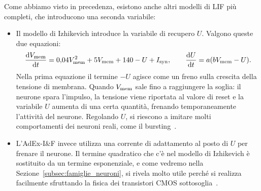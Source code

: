 Come abbiamo visto in precedenza, esistono anche altri modelli di LIF più completi, che introducono una seconda variabile:
\begin{itemize}
  \item Il modello di Izhikevich introduce la variabile di recupero $U$. Valgono queste due equazioni:
  \begin{equation}
    \frac{\mathrm{d}V_{\mathrm{mem}}}{\mathrm{d}t} = 0{,}04V_{\mathrm{mem}}^2 + 5V_{\mathrm{mem}} + 140 - U + I_{\mathrm{syn}},
    \qquad
    \frac{\mathrm{d}U}{\mathrm{d}t} = a(bV_{\mathrm{mem}} - U).
    \label{eq:izhikevich}
  \end{equation}
  Nella prima equazione il termine $-U$ agisce come un freno sulla crescita della tensione di membrana. Quando $V_{\mathrm{mem}}$ sale fino a raggiungere la soglia: il neurone spara l'impulso, la tensione viene riportata al valore di reset e la variabile $U$ aumenta di una certa quantità, frenando temporaneamente l'attività del neurone. Regolando $U$, si riescono a imitare molti comportamenti dei neuroni reali, come il bursting~\cite{indiveri2011, ronchini2023}.
  \item L'AdEx-I\&F invece utilizza una corrente di adattamento al posto di $U$ per frenare il neurone. Il termine quadratico che c'è nel modello di Izhikevich è sostituito da un termine esponenziale, e come vedremo nella Sezione~\ref{subsec:famiglie_neuroni}, si rivela molto utile perché si realizza facilmente sfruttando la fisica dei transistori CMOS sottosoglia~\cite{indiveri2011}.
\end{itemize}
